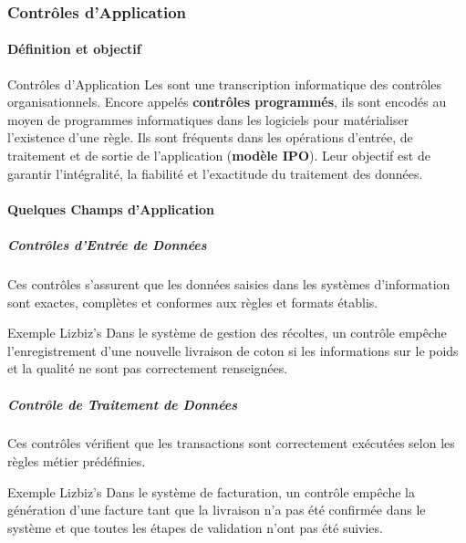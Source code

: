 \subsubsection{Contrôles d'Application}

\paragraph{Définition et objectif}

\begin{boxdef}{Contrôles d'Application}
Les  sont une transcription informatique des
contrôles organisationnels. Encore appelés \textbf{contrôles programmés}, ils sont
encodés au moyen de programmes informatiques dans les logiciels pour matérialiser
l'existence d'une règle. Ils sont fréquents dans les opérations d'entrée, de traitement
et de sortie de l'application (\textbf{modèle IPO}). Leur objectif est de garantir
l'intégralité, la fiabilité et l'exactitude du traitement des données.
\end{boxdef}

\paragraph{Quelques Champs d'Application}

\subparagraph{Contrôles d'Entrée de Données}
Ces contrôles s'assurent que les données saisies dans les systèmes d'information
sont exactes, complètes et conformes aux règles et formats établis.

\begin{boxlizbiz}{Exemple Lizbiz's}
Dans le système de gestion des récoltes, un contrôle empêche l'enregistrement d'une
nouvelle livraison de coton si les informations sur le poids et la qualité ne sont pas
correctement renseignées.
\end{boxlizbiz}

\subparagraph{Contrôle de Traitement de Données}
Ces contrôles vérifient que les transactions sont correctement exécutées selon les
règles métier prédéfinies.

\begin{boxlizbiz}{Exemple Lizbiz's}
Dans le système de facturation, un contrôle empêche la génération d'une facture tant
que la livraison n'a pas été confirmée dans le système et que toutes les étapes de
validation n'ont pas été suivies.
\end{boxlizbiz}

